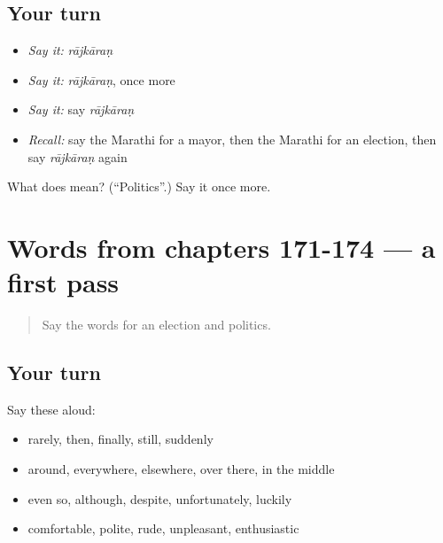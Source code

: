 \subsection*{Your turn}
\begin{itemize}
\raggedright
  \item \emph{Say it:} \emph{rājkāraṇ}
  \item \emph{Say it:} \emph{rājkāraṇ}, once more
  \item \emph{Say it:} say \emph{rājkāraṇ}
  \item \emph{Recall:} say the Marathi for a mayor, then the Marathi for an election, then say \emph{rājkāraṇ} again
\end{itemize}

\begin{tcolorbox}[breakable,colback=teal!4,colframe=teal!35!black,title={Before you move on}]
What does  mean? (\textquotedblleft{}Politics\textquotedblright{}.) Say it once more.
\end{tcolorbox}
\section[(dialogue)]{Words from chapters 171-174 — a first pass}

\label{lesson:MR-R179-first-pass-words-from-chapters-171-174}



\begin{quote}
Say the words for an election and politics.
\end{quote}

\subsection*{Your turn}
Say these aloud:

\begin{itemize}
\raggedright
  \item rarely, then, finally, still, suddenly
  \item around, everywhere, elsewhere, over there, in the middle
  \item even so, although, despite, unfortunately, luckily
  \item comfortable, polite, rude, unpleasant, enthusiastic
\end{itemize}

